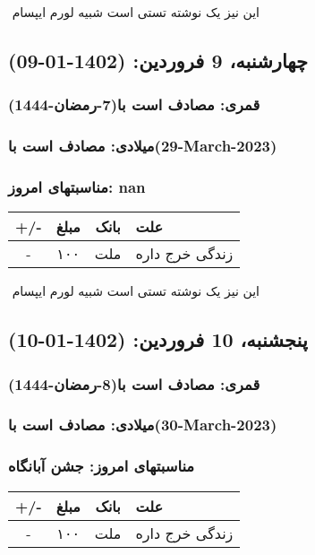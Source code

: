 \documentclass{article}
\newcommand{\rnote}[1]{\marginpar{\textcolor{color}{\StrSubstitute{\##1}{ }{\_}}}}
\newcommand{\myRow}[4]{
    #1 & #2 & #3 & #4 \\ \hline
}
\begin{document}
‌
\rnote{تست}
این نیز یک نوشته تستی است شبیه لورم ایپسام




\newpage
{}
\textcolor{color}{
\section{ چهارشنبه، 9 فروردین: (1402-01-09) }
\subsubsection*{قمری: مصادف است با(7-رمضان-1444)} 
\subsubsection*{میلادی: مصادف است با(29-March-2023)}
\subsubsection*{مناسبتهای امروز: nan}
}


\begin{tabular}{ | c | c | c | p{5cm} |}
    \hline
    \myRow{ +/- }{مبلغ}{بانک}{علت}
    \myRow{-}{۱۰۰}{ملت}{زندگی خرج داره}
\end{tabular}
\newline
\newline

‌
\rnote{تست}
این نیز یک نوشته تستی است شبیه لورم ایپسام




\newpage
{}
\textcolor{color}{
\section{ پنجشنبه، 10 فروردین: (1402-01-10) }
\subsubsection*{قمری: مصادف است با(8-رمضان-1444)} 
\subsubsection*{میلادی: مصادف است با(30-March-2023)}
\subsubsection*{مناسبتهای امروز: جشن آبانگاه}
}


\begin{tabular}{ | c | c | c | p{5cm} |}
    \hline
    \myRow{ +/- }{مبلغ}{بانک}{علت}
    \myRow{-}{۱۰۰}{ملت}{زندگی خرج داره}
\end{tabular}
\newline
\newline
\end{document}
